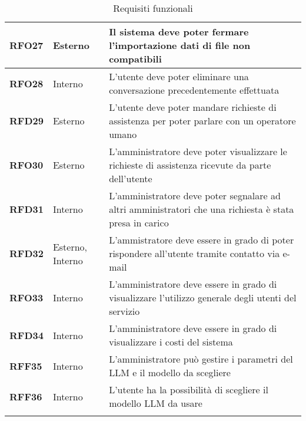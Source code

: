 \begin{longtable}{|>{\centering\arraybackslash}m{}|>{\centering\arraybackslash}m{}|>{\arraybackslash}m{}|}
	\hline
	\textbf{RFO27} & Esterno & Il sistema deve poter fermare l'importazione dati di file non compatibili\\
	\hline
	\textbf{RFO28} & Interno & L'utente deve poter eliminare una conversazione precedentemente effettuata\\
	\hline
	\textbf{RFD29} & Esterno & L'utente deve poter mandare richieste di assistenza per poter parlare con un operatore umano\\
	\hline
	\textbf{RFO30} & Esterno & L'amministratore deve poter visualizzare le richieste di assistenza ricevute da parte dell'utente\\
	\hline
	\textbf{RFD31} & Interno & L'amministratore deve poter segnalare ad altri amministratori che una richiesta è stata presa in carico\\
	\hline
	\textbf{RFD32} & Esterno, Interno & L'ammistratore deve essere in grado di poter rispondere all'utente tramite contatto via e-mail\\
	\hline
	\textbf{RFO33} & Interno & L'amministratore deve essere in grado di visualizzare l'utilizzo generale degli utenti del servizio\\
	\hline
	\textbf{RFD34} & Interno & L'amministratore deve essere in grado di visualizzare i costi del sistema\\
	\hline
	\textbf{RFF35} & Interno & L'amministratore può gestire i parametri del LLM e il modello da scegliere\\
	\hline
	\textbf{RFF36} & Interno & L'utente ha la possibilità di scegliere il modello LLM da usare 
	\\\hline
	\caption{Requisiti funzionali}
\end{longtable}

\pagebreak
